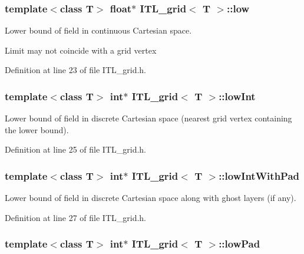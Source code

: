 \hypertarget{classITL__grid_abdab084ddf12b7bf745a4b76201757bf}{
\subsubsection[{low}]{\setlength{\rightskip}{0pt plus 5cm}template$<$class T$>$ float$\ast$ {\bf ITL\_\-grid}$<$ T $>$::{\bf low}}}
\label{classITL__grid_abdab084ddf12b7bf745a4b76201757bf}


Lower bound of field in continuous Cartesian space. 

Limit may not coincide with a grid vertex 

Definition at line 23 of file ITL\_\-grid.h.

\hypertarget{classITL__grid_a3780830b49b613a702233bf4b9ccc467}{
\subsubsection[{lowInt}]{\setlength{\rightskip}{0pt plus 5cm}template$<$class T$>$ int$\ast$ {\bf ITL\_\-grid}$<$ T $>$::{\bf lowInt}}}
\label{classITL__grid_a3780830b49b613a702233bf4b9ccc467}


Lower bound of field in discrete Cartesian space (nearest grid vertex containing the lower bound). 



Definition at line 25 of file ITL\_\-grid.h.

\hypertarget{classITL__grid_a14f44c2a00f16d0c35a2cfbb72f61423}{
\subsubsection[{lowIntWithPad}]{\setlength{\rightskip}{0pt plus 5cm}template$<$class T$>$ int$\ast$ {\bf ITL\_\-grid}$<$ T $>$::{\bf lowIntWithPad}}}
\label{classITL__grid_a14f44c2a00f16d0c35a2cfbb72f61423}


Lower bound of field in discrete Cartesian space along with ghost layers (if any). 



Definition at line 27 of file ITL\_\-grid.h.

\hypertarget{classITL__grid_a1d7b33b487dbe224fa10f11a23ee9f26}{
\subsubsection[{lowPad}]{\setlength{\rightskip}{0pt plus 5cm}template$<$class T$>$ int$\ast$ {\bf ITL\_\-grid}$<$ T $>$::{\bf lowPad}}}
\label{classITL__grid_a1d7b33b487dbe224fa10f11a23ee9f26}


